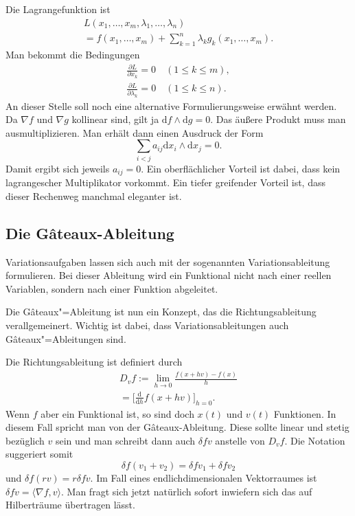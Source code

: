 \documentclass[a4paper,10pt,fleqn,twocolumn,twoside]{article}
\begin{document}
Die Lagrangefunktion ist
\begin{gather*}
L(x_1,\ldots,x_m,\lambda_1,\ldots,\lambda_n)\\
= f(x_1,\ldots,x_m)+\sum_{k=1}^n \lambda_k g_k(x_1,\ldots,x_m).
\end{gather*}
Man bekommt die Bedingungen
\begin{gather*}
\frac{\partial L}{\partial x_k}=0 \quad (1\le k\le m),\\
\frac{\partial L}{\partial \lambda_k}=0 \quad (1\le k\le n).
\end{gather*}
An dieser Stelle soll noch eine alternative Formulierungsweise
erwähnt werden. Da \(\nabla f\) und \(\nabla g\) kollinear sind,
gilt ja \(\mathrm df\wedge\mathrm dg=0\). Das äußere Produkt muss
man ausmultiplizieren. Man erhält dann einen Ausdruck der Form
\[\sum_{i<j} a_{ij}\mathrm dx_i\wedge\mathrm dx_j=0.\]
Damit ergibt sich jeweils \(a_{ij}=0\). Ein oberflächlicher Vorteil
ist dabei, dass kein lagrangescher Multiplikator vorkommt.
Ein tiefer greifender Vorteil ist, dass dieser Rechenweg manchmal
eleganter ist.

\subsection{Die Gâteaux-Ableitung}

Variationsaufgaben lassen sich auch mit der sogenannten
Variationsableitung formulieren. Bei dieser Ableitung wird ein
Funktional nicht nach einer reellen Variablen, sondern nach einer
Funktion abgeleitet.

Die Gâteaux"=Ableitung ist nun ein Konzept, das die Richtungsableitung
verallgemeinert. Wichtig ist dabei, dass Variationsableitungen auch
Gâteaux"=Ableitungen sind.

Die Richtungsableitung ist definiert durch
\begin{gather*}
D_v f := \lim_{h\rightarrow 0} \frac{f(x+hv)-f(x)}{h}\\
= \Big[\frac{\mathrm d}{\mathrm dh}f(x+hv)\Big]_{h=0}.
\end{gather*}
Wenn \(f\) aber ein Funktional ist, so sind doch \(x(t)\) und \(v(t)\)
Funktionen. In diesem Fall spricht man von der Gâteaux-Ableitung.
Diese sollte linear und stetig bezüglich \(v\) sein und man schreibt dann
auch \(\delta f v\) anstelle von \(D_v f\). Die Notation suggeriert
somit
\[\delta f(v_1+v_2) = \delta fv_1 + \delta fv_2\]
und \(\delta f(rv) = r\delta fv\). Im Fall eines endlichdimensionalen
Vektorraumes ist \(\delta f v = \langle \nabla f,v\rangle\). Man
fragt sich jetzt natürlich sofort inwiefern sich das auf
Hilberträume übertragen lässt.
\end{document}
